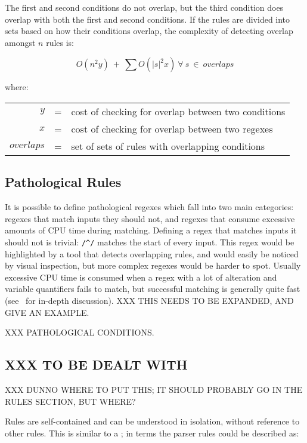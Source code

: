 \noindent{}The first and second conditions do not overlap, but the third
condition does overlap with both the first and second conditions.  If the
rules are divided into sets based on how their conditions overlap, the
complexity of detecting overlap amongst $n$ rules is:

$$O(n^{2}y)~+~\sum{O(|s|^{2}x)~\forall{}~s~\in{}~overlaps}$$

where:

\begin{tabular}[]{rcl}

            $y$ & = & cost of checking for overlap between two conditions \\
            $x$ & = & cost of checking for overlap between two regexes    \\
     $overlaps$ & = & set of sets of rules with overlapping conditions    \\

\end{tabular}

\subsection{Pathological Rules}

It is possible to define pathological regexes which fall into two main
categories: regexes that match inputs they should not, and regexes that
consume excessive amounts of CPU time during matching.  Defining a regex
that matches inputs it should not is trivial: \verb!/^/! matches the start
of every input.  This regex would be highlighted by a tool that detects
overlapping rules, and would easily be noticed by visual inspection, but
more complex regexes would be harder to spot.  Usually excessive CPU time
is consumed when a regex with a lot of alteration and variable quantifiers
fails to match, but successful matching is generally quite fast
(see~\cite{mastering-regular-expressions} for in-depth discussion).  XXX
THIS NEEDS TO BE EXPANDED, AND GIVE AN EXAMPLE\@.

XXX PATHOLOGICAL CONDITIONS\@.


\subsection{XXX TO BE DEALT WITH}

XXX DUNNO WHERE TO PUT THIS\@; IT SHOULD PROBABLY GO IN THE RULES SECTION,
BUT WHERE\@?

Rules are self-contained and can be understood in isolation, without
reference to other rules.  This is similar to a ; in
 terms the parser rules could be described as:

